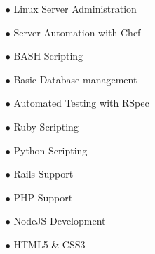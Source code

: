 \documentclass[12pt]{article}
\newenvironment{resblock}[1]
  {\noindent{\large\bf{#1}}}
  {\par\vspace{0.35in}}
\begin{document}

\setlength\multicolsep{0pt}
\begin{resblock}{Skills}
  \begin{changemargin}{0em}{0em}
  \begin{multicols}{3}\begin{flushleft}\begin{itemize}
    \item[$\bullet$]Linux Server \mbox{Administration}
    \item[$\bullet$]Server \mbox{Automation} with Chef
    \item[$\bullet$]BASH Scripting
    \item[$\bullet$]Basic Database \mbox{management}
    \item[$\bullet$]Automated Testing with RSpec
    \item[$\bullet$]Ruby Scripting
    \item[$\bullet$]Python Scripting
    \item[$\bullet$]Rails Support
    \item[$\bullet$]PHP Support
    \item[$\bullet$]NodeJS Development
    \item[$\bullet$]HTML5 \& CSS3
  \end{itemize}\end{flushleft}\end{multicols}
  \end{changemargin}
\end{resblock}
\end{document}
